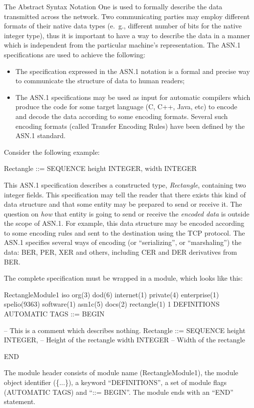 \documentclass[english,oneside,12pt]{book}
\begin{document}
The Abstract Syntax Notation One is used to formally describe the
data transmitted across the network. Two communicating parties may employ
different formats of their native data types (e.~g., different number
of bits for the native integer type), thus it is important to have
a way to describe the data in a manner which is independent from the
particular machine's representation.
The ASN.1 specifications are used to achieve the following:
\begin{itemize}
\item The specification expressed in the ASN.1 notation is a formal and
precise way to communicate the structure of data to human readers;
\item The ASN.1 specifications may be used as input for automatic compilers
which produce the code for some target language (C, C++, Java, etc)
to encode and decode the data according to some encoding formats.
Several such encoding formats (called Transfer Encoding Rules)
have been defined by the ASN.1 standard.
\end{itemize}
Consider the following example:
\begin{asn}
Rectangle ::= SEQUENCE {
    height  INTEGER,
    width   INTEGER
}
\end{asn}
This ASN.1 specification describes a constructed type, \emph{Rectangle},
containing two integer fields. This specification may tell the reader
that there exists this kind of data structure and that some entity
may be prepared to send or receive it. The question on \emph{how}
that entity is going to send or receive the \emph{encoded data} is
outside the scope of ASN.1. For example, this data structure may be
encoded according to some encoding rules and sent to the destination
using the TCP protocol. The ASN.1 specifies several ways of encoding
(or ``serializing'', or ``marshaling'') the data: BER, PER, XER
and others, including CER and DER derivatives from BER.

The complete specification must be wrapped in a module, which looks
like this:
\begin{asn}
RectangleModule1
    { iso org(3) dod(6) internet(1) private(4)
      enterprise(1) spelio(9363) software(1)
      asn1c(5) docs(2) rectangle(1) 1 }
    DEFINITIONS AUTOMATIC TAGS ::=
BEGIN

-- This is a comment which describes nothing.
Rectangle ::= SEQUENCE {
    height  INTEGER,        -- Height of the rectangle
    width   INTEGER         -- Width of the rectangle
}

END
\end{asn}
The module header consists of module name (RectangleModule1), the
module object identifier (\{...\}), a keyword ``DEFINITIONS'', a
set of module flags (AUTOMATIC TAGS) and ``::= BEGIN''. The module
ends with an ``END'' statement.
\end{document}
